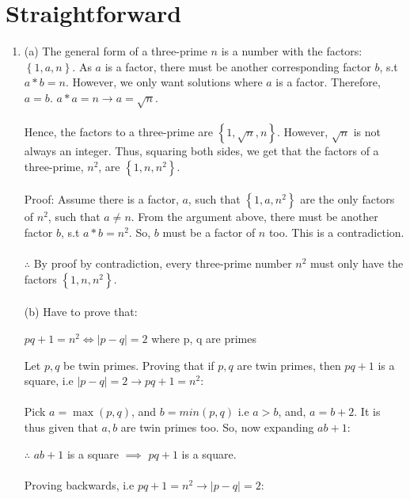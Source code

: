 \documentclass[a4paper]{article}
\begin{document}
\section{Straightforward}
\begin{enumerate}
    \item (a) The general form of a three-prime $n$ is a number with the factors: $\left\{ 1, a, n \right\}$. As $a$ is a factor, there must be another corresponding factor $b$, s.t $a * b = n$. However, we only want solutions where $a$ is a factor. Therefore, $a = b$. $a * a = n \rightarrow a = \sqrt{n}$. \\
    \\ 
    Hence, the factors to a three-prime are $\left\{ 1, \sqrt{n}, n \right\}$. However, $\sqrt{n}$ is not always an integer. Thus, squaring both sides, we get that the factors of a three-prime, $n^2$, are $\left\{ 1, n, n^2 \right\}$.\\
    \\
    Proof: Assume there is a factor, $a$, such that $\left\{ 1, a, n^2 \right\}$ are the only factors of $n^2$, such that $a \neq n$. From the argument above, there must be another factor $b$, s.t $a * b = n^2$. So, $b$ must be a factor of $n$ too. This is a contradiction.\\
    \\
    $\therefore$ By proof by contradiction, every three-prime number $n^2$ must only have the factors $\left\{ 1, n, n^2 \right\}$. \\
    \\ 
    (b) Have to prove that:
    \begin{center}
        $pq + 1 = n^2 \Leftrightarrow |p-q| = 2$ where p, q are primes
    \end{center}
    Let $p, q$ be twin primes. Proving that if $p, q$ are twin primes, then $pq + 1$ is a square, i.e $|p-q| = 2 \rightarrow pq + 1 = n^2$:\\
    \\ 
    Pick $a = \max(p, q)$, and $b=min(p, q)$ i.e $a > b$, and, $a = b+2$. It is thus given that $a, b$ are twin primes too. So, now expanding $ab + 1$: 

    $\therefore$ $ab + 1$ is a square $\implies$ $pq + 1$ is a square. \\
    \\  
    Proving backwards, i.e $pq + 1 = n^2 \rightarrow |p-q| = 2$:


\end{enumerate}
\end{document}
